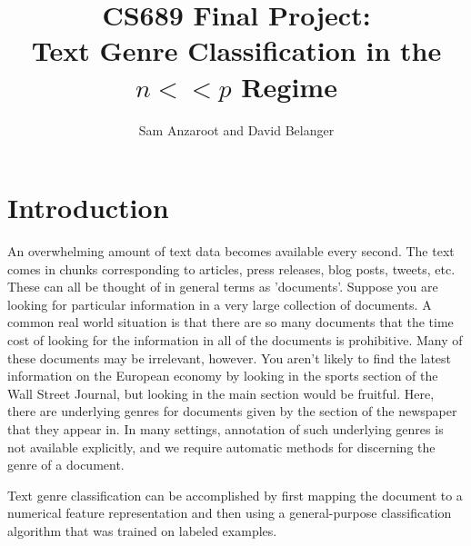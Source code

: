 \documentclass[]{article}
\begin{document}
\title{CS689 Final Project:\\ Text Genre Classification in the $n <<p$ Regime}
\author{Sam Anzaroot and David Belanger}
\maketitle
\section{Introduction}

An overwhelming amount of text data becomes available every second. The text comes in chunks corresponding to articles, press releases, blog posts, tweets, etc. These can all be thought of in general terms as 'documents'. Suppose you are looking for particular information in a very large collection of documents. A common real world situation is that there are so many documents that the time cost of looking for the information in all of the documents is prohibitive. Many of these documents may be irrelevant, however. You aren't likely to find the latest information on the European economy by looking in the sports section of the Wall Street Journal, but looking in the main section would be fruitful. Here, there are underlying genres for documents given by the section of the newspaper that they appear in. In many settings, annotation of such underlying genres is not available explicitly, and we require automatic methods for discerning the genre of a document. 

Text genre classification can be accomplished by first mapping the document to a numerical feature representation and then using a general-purpose classification algorithm that was trained on labeled examples. 
\end{document}
